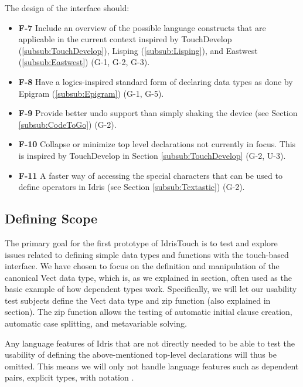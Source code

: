 The design of the interface should:

\begin{itemize}     
	\item \textbf{F-7} Include an overview of the possible language constructs that are
	applicable in the current context inspired by TouchDevelop (\ref{subsub:TouchDevelop}), Lisping
	(\ref{subsub:Lisping}), and Eastwest (\ref{subsub:Eastwest}) (G-1, G-2, G-3).
	\item \textbf{F-8} Have a logics-inspired standard form of declaring data types as done by Epigram
	(\ref{subsub:Epigram}) (G-1, G-5).
	\item \textbf{F-9} Provide better undo support than simply shaking the device (see Section
	\ref{subsub:CodeToGo}) (G-2).
	\item \textbf{F-10} Collapse or minimize top level declarations not currently in focus. This is inspired by TouchDevelop
	in Section \ref{subsub:TouchDevelop} (G-2, U-3).
	\item \textbf{F-11} A faster way of accessing the special characters that can be used 
	to define operators in Idris (see Section \ref{subsub:Textastic}) (G-2).
\end{itemize}


\subsection{Defining Scope} 
The primary goal for the first prototype of IdrisTouch is to test and explore
issues related to defining simple data types and functions with the touch-based interface. 
We have chosen to focus on the definition and manipulation of the canonical Vect data type, which is, as we explained in
section, often used as the basic example of how dependent types
work. Specifically, we will let our usability test subjects define the Vect data type and zip
function (also explained in section). The zip function allows the
testing of automatic initial clause creation, automatic case splitting, and metavariable solving.

Any language features of Idris that are not directly needed to be able to test
the usability of defining the above-mentioned top-level declarations will thus
be omitted. This means we will only not handle language features such as
dependent pairs, explicit types, with notation .




